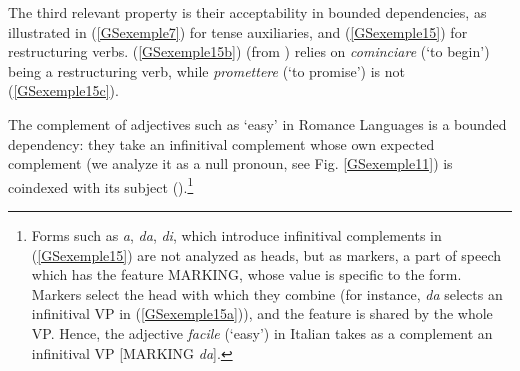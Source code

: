 \documentclass[output=paper
	        ,collection
	        ,collectionchapter
 	        ,biblatex
                ,babelshorthands
                ,newtxmath
                ,draftmode
                ,colorlinks, citecolor=brown
]{langscibook}
\begin{document}
{The third relevant property is their acceptability in bounded dependencies, as illustrated in (\ref{GSexemple7}) for tense auxiliaries, and (\ref{GSexemple15}) for restructuring verbs. (\ref{GSexemple15b}) (from \citealt[341]{Monachesi98a}) relies on \emph{cominciare} (`to begin') being a restructuring verb, while \emph{promettere} (`to promise') is not (\ref{GSexemple15c}).  

\eal 
	\label{GSexemple15} 
    \label{GSexemple15a} 
		
	\label{GSexemple15b}
		
	\label{GSexemple15c} 	
\zl

The complement of adjectives such as `easy' in Romance Languages is a bound\-ed dependency: they take an infinitival complement whose own expected complement (we analyze it as a null pronoun, see Fig. \ref{GSexemple11}) is coindexed with its subject (\citealt{AGS1998, Monachesi98a}).\footnote{Forms such as \emph{a}, \emph{da}, \emph{di}, which introduce infinitival complements in (\ref{GSexemple15}) are not analyzed as heads, but as markers, a part of speech which has the feature MARKING, whose value is specific to the form. Markers select the head with which they combine (for instance, \emph{da} selects an infinitival VP in (\ref{GSexemple15a})), and the feature is shared by the whole VP. Hence, the adjective \emph{facile} (`easy') in Italian takes as a complement an infinitival VP [MARKING \emph{da}].}

\begin{exe}
\end{exe}

}
\end{document}
